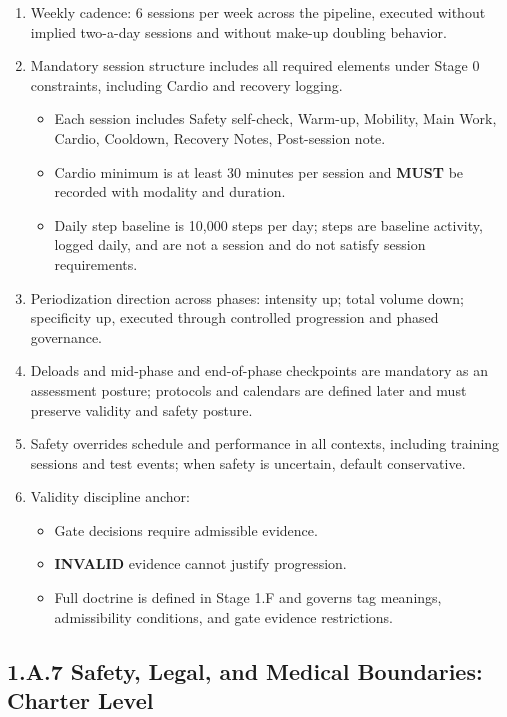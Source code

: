 \documentclass[10pt]{article}
\begin{document}
\begin{enumerate}
\item Weekly cadence: 6 sessions per week across the pipeline, executed without implied two-a-day sessions and without make-up doubling behavior.

\item Mandatory session structure includes all required elements under Stage 0 constraints, including Cardio and recovery logging.

\begin{itemize}
\item Each session includes Safety self-check, Warm-up, Mobility, Main Work, Cardio, Cooldown, Recovery Notes, Post-session note.
\item Cardio minimum is at least 30 minutes per session and \textbf{MUST} be recorded with modality and duration.
\item Daily step baseline is 10,000 steps per day; steps are baseline activity, logged daily, and are not a session and do not satisfy session requirements.
\end{itemize}

\item Periodization direction across phases: intensity up; total volume down; specificity up, executed through controlled progression and phased governance.

\item Deloads and mid-phase and end-of-phase checkpoints are mandatory as an assessment posture; protocols and calendars are defined later and must preserve validity and safety posture.

\item Safety overrides schedule and performance in all contexts, including training sessions and test events; when safety is uncertain, default conservative.

\item Validity discipline anchor:

\begin{itemize}
\item Gate decisions require admissible evidence.
\item \textbf{INVALID} evidence cannot justify progression.
\item Full doctrine is defined in Stage 1.F and governs tag meanings, admissibility conditions, and gate evidence restrictions.
\end{itemize}
\end{enumerate}

\subsection*{1.A.7 Safety, Legal, and Medical Boundaries: Charter Level}
{}
\end{document}
